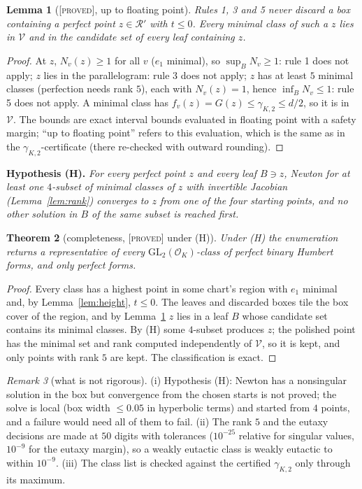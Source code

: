 \documentclass[11pt]{amsart}
\newtheorem{theorem}{Theorem}[section]
\newtheorem{lemma}[theorem]{Lemma}
\theoremstyle{definition}
\theoremstyle{remark}
\newtheorem{remark}[theorem]{Remark}
\newcommand{\OK}{\mathcal{O}_K}
\newcommand{\GL}{\mathrm{GL}}
\newcommand{\gK}{\gamma_{K,2}}
\newcommand{\PROVED}{\textsc{[proved]}}
\begin{document}
\begin{lemma}[\PROVED, up to floating point]\label{lem:rules}
Rules 1, 3 and 5 never discard a box containing a perfect point $z\in\mathcal R'$ with $t\le0$.
Every minimal class of such a $z$ lies in $\mathcal V$ and in the candidate set of every
leaf containing $z$.
\end{lemma}
\begin{proof}
At $z$, $N_v(z)\ge1$ for all $v$ ($e_1$ minimal), so $\sup_BN_v\ge1$: rule 1 does not apply;
$z$ lies in the parallelogram: rule 3 does not apply; $z$ has at least $5$ minimal classes
(perfection needs rank $5$), each with $N_v(z)=1$, hence $\inf_BN_v\le1$: rule 5 does not
apply.  A minimal class has $f_v(z)=G(z)\le\gK\le d/2$, so it is in $\mathcal V$.  The bounds
are exact interval bounds evaluated in floating point with a safety margin; ``up to floating
point'' refers to this evaluation, which is the same as in the $\gK$-certificate (there
re-checked with outward rounding).
\end{proof}

\noindent
\textbf{Hypothesis (H).}  \emph{For every perfect point $z$ and every leaf $B\ni z$, Newton for
at least one $4$-subset of minimal classes of $z$ with invertible Jacobian (Lemma~\ref{lem:rank})
converges to $z$ from one of the four starting points, and no other solution in $B$ of the
same subset is reached first.}

\begin{theorem}[completeness, \PROVED{} under (H)]\label{thm:complete}
Under (H) the enumeration returns a representative of every $\GL_2(\OK)$-class of perfect
binary Humbert forms, and only perfect forms.
\end{theorem}
\begin{proof}
Every class has a highest point in some chart's region with $e_1$ minimal and, by
Lemma~\ref{lem:height}, $t\le0$.  The leaves and discarded boxes tile the box cover of the
region, and by Lemma~\ref{lem:rules} $z$ lies in a leaf $B$ whose candidate set contains its
minimal classes.  By (H) some $4$-subset produces $z$; the polished point has the minimal set
and rank computed independently of $\mathcal V$, so it is kept, and only points with rank $5$
are kept.  The classification is exact.
\end{proof}

\begin{remark}[what is not rigorous]\label{rem:nonrig}
(i) Hypothesis (H): Newton has a nonsingular solution in the box but convergence from the
chosen starts is not proved; the solve is local (box width $\le0.05$ in hyperbolic terms) and
started from $4$ points, and a failure would need all of them to fail.  (ii) The rank $5$ and
the eutaxy decisions are made at $50$ digits with tolerances ($10^{-25}$ relative for singular
values, $10^{-9}$ for the eutaxy margin), so a weakly eutactic class is weakly eutactic to within
$10^{-9}$.  (iii) The class list is checked against the certified $\gK$ only through its maximum.
\end{remark}
\end{document}
